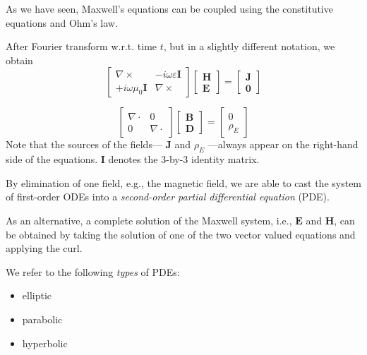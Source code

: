 \documentclass[
  a4paper,
  DIV=11,
  numbers=noendperiod]{scrreprt}
\providecommand{\tightlist}{%
  \setlength{\itemsep}{0pt}\setlength{\parskip}{0pt}}\usepackage{longtable,booktabs,array}
\begin{document}
As we have seen, Maxwell's equations can be coupled using the
constitutive equations and Ohm's law.

After Fourier transform w.r.t. time \(t\), but in a slightly different
notation, we obtain \[
\begin{bmatrix}
\nabla \times & -i\omega\varepsilon \mathbf I \\
+i\omega\mu_0 \mathbf I & \nabla \times
\end{bmatrix}
\begin{bmatrix}
\mathbf H \\ \mathbf E
\end{bmatrix} = 
\begin{bmatrix}
\mathbf J \\ \mathbf 0
\end{bmatrix}
\]

\[
\begin{bmatrix}
\nabla \cdot & 0 \\
0 & \nabla \cdot
\end{bmatrix}
\begin{bmatrix}
\mathbf B \\ \mathbf D
\end{bmatrix} = 
\begin{bmatrix}
0 \\ \rho_E
\end{bmatrix}
\] Note that the sources of the fields--- \(\mathbf J\) and \(\rho_E\)
---always appear on the right-hand side of the equations. \(\mathbf I\)
denotes the 3-by-3 identity matrix.

By elimination of one field, e.g., the magnetic field, we are able to
cast the system of first-order ODEs into a \emph{second-order partial
differential equation} (PDE).

As an alternative, a complete solution of the Maxwell system, i.e.,
\(\mathbf E\) and \(\mathbf H\), can be obtained by taking the solution
of one of the two vector valued equations and applying the curl.

We refer to the following \emph{types} of PDEs:

\begin{itemize}
\tightlist
\item
  elliptic
\item
  parabolic
\item
  hyperbolic
\end{itemize}
\end{document}
